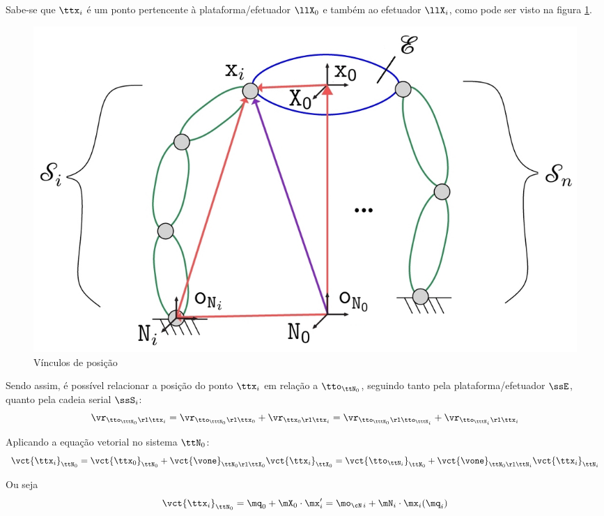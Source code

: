 \documentclass[]{politex}
\begin{document}
Sabe-se que $\ttx_i$ é um ponto pertencente à plataforma/efetuador $\llX_0$ e também ao efetuador $\llX_i$, como pode ser visto na figura \ref{fig:VinculosDePosicao}.
\begin{figure}[h]
	\centering
	\includegraphics[scale=1.0]{imagens/VinculosDePosicao.jpg}  
	\caption{Vínculos de posição}
	\label{fig:VinculosDePosicao}
\end{figure}

Sendo assim, é possível relacionar a posição do ponto $\ttx_i$ em relação a $\tto_{\ttN_0}$, seguindo tanto pela plataforma/efetuador $\ssE$, quanto pela cadeia serial $\ssS_i$:
\begin{equation}
\vr_{\tto_{\tttN_0} \rl \ttx_i} = \vr_{\tto_{\tttN_0} \rl \ttx_0} + \vr_{\ttx_0 \rl \ttx_i} = \vr_{\tto_{\tttN_0} \rl \tto_{\tttN_i}} + \vr_{\tto_{\tttN_i} \rl \ttx_i}
\end{equation}

Aplicando a equação vetorial no sistema $\ttN_0$:
\begin{equation}
\vct{\ttx_i}_{\ttN_0} =  \vct{\ttx_0}_{\ttN_0} + \vct{\vone}_{\ttN_0 \rl \ttX_0} \vct{\ttx_i}_{\ttX_0} = \vct{\tto_{\ttN_i}}_{\ttN_0}  + \vct{\vone}_{\ttN_0 \rl \ttN_i} \vct{\ttx_i}_{\ttN_i}
\end{equation}

Ou seja
\begin{equation}
\vct{\ttx_i}_{\ttN_0} =  \mq_0 + \mX_0 \cdot \mx'_i = \mo_{\cN\,i}  + \mN_i \cdot \mx_i(\mq_i)
\end{equation}
\end{document}
